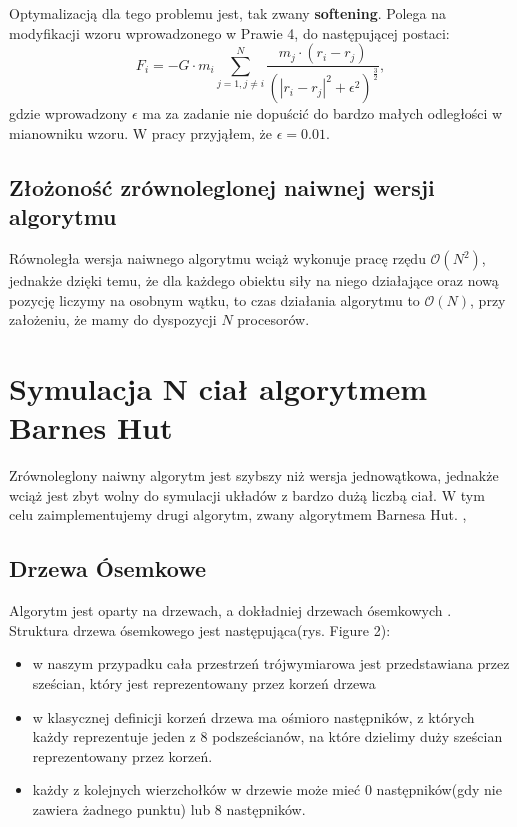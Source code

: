 \documentclass[14pt,twoside,a4paper]{article}
\theoremstyle{definition}
\begin{document}
Optymalizacją dla tego problemu jest, tak zwany \textbf{softening}\cite[str.~21]{Aarseth}. Polega na modyfikacji wzoru wprowadzonego w Prawie 4, do następującej postaci:
$$F_i = -G\cdot m_i \sum_{j=1, j\neq i}^N \frac{m_j\cdot (r_i - r_j)}{(|r_i - r_j|^2 + \epsilon^{2})^{\frac{3}{2}}},$$ 
gdzie wprowadzony $\epsilon$ ma za zadanie nie dopuścić do bardzo małych odległości w mianowniku wzoru. W pracy przyjąłem, że $\epsilon = 0.01$.

\subsection{\Large Złożoność zrównoleglonej naiwnej wersji algorytmu}
Równoległa wersja naiwnego algorytmu wciąż wykonuje pracę rzędu $\mathcal{O}(N^{2})$, jednakże dzięki temu, że dla każdego obiektu siły na niego działające oraz nową pozycję liczymy na osobnym wątku, to czas działania algorytmu to $\mathcal{O}(N)$, przy założeniu, że mamy do dyspozycji $N$ procesorów.

\section{\LARGE Symulacja N ciał algorytmem Barnes Hut}
Zrównoleglony naiwny algorytm jest szybszy niż wersja jednowątkowa, jednakże wciąż jest zbyt wolny do symulacji układów z bardzo dużą liczbą ciał. W tym celu zaimplementujemy drugi algorytm, zwany algorytmem Barnesa Hut. \cite[str.~446-449]{barnhut}, \cite{barneshut}

\subsection{\Large Drzewa Ósemkowe}

Algorytm jest oparty na drzewach, a dokładniej drzewach ósemkowych \cite{octree}.
Struktura drzewa ósemkowego jest następująca(rys. Figure 2):
\begin{itemize}
  \item w naszym przypadku cała przestrzeń trójwymiarowa jest przedstawiana przez sześcian, który jest reprezentowany przez korzeń drzewa
  \item w klasycznej definicji korzeń drzewa ma ośmioro następników, z których każdy reprezentuje jeden z 8 podsześcianów, na które dzielimy duży sześcian reprezentowany przez korzeń.
  \item każdy z kolejnych wierzchołków w drzewie może mieć 0 następników(gdy nie zawiera żadnego punktu) lub 8 następników.
\end{itemize}
\end{document}
